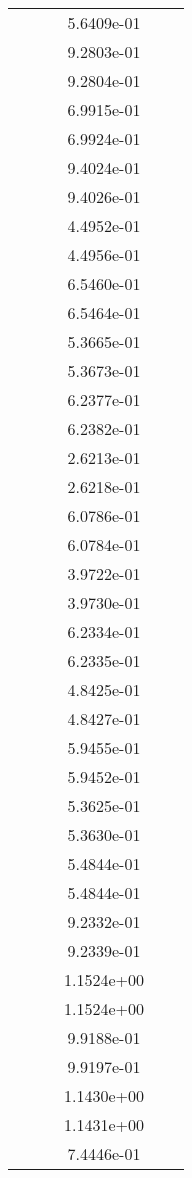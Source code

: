 \begin{xltabular}{\textwidth}{r|rS[table-format=1.3e+2]S[table-format=1.4e+2]S[table-format=1.4e+2]S[table-format=-1.5]}
&  &  & 5.6409e-01 & & \\
&  &  & 9.2803e-01 & & \\
&  &  & 9.2804e-01 & & \\
&  &  & 6.9915e-01 & & \\
&  &  & 6.9924e-01 & & \\
&  &  & 9.4024e-01 & & \\
&  &  & 9.4026e-01 & & \\
&  &  & 4.4952e-01 & & \\
&  &  & 4.4956e-01 & & \\
&  &  & 6.5460e-01 & & \\
&  &  & 6.5464e-01 & & \\
&  &  & 5.3665e-01 & & \\
&  &  & 5.3673e-01 & & \\
&  &  & 6.2377e-01 & & \\
&  &  & 6.2382e-01 & & \\
&  &  & 2.6213e-01 & & \\
&  &  & 2.6218e-01 & & \\
&  &  & 6.0786e-01 & & \\
&  &  & 6.0784e-01 & & \\
&  &  & 3.9722e-01 & & \\
&  &  & 3.9730e-01 & & \\
&  &  & 6.2334e-01 & & \\
&  &  & 6.2335e-01 & & \\
&  &  & 4.8425e-01 & & \\
&  &  & 4.8427e-01 & & \\
&  &  & 5.9455e-01 & & \\
&  &  & 5.9452e-01 & & \\
&  &  & 5.3625e-01 & & \\
&  &  & 5.3630e-01 & & \\
&  &  & 5.4844e-01 & & \\
&  &  & 5.4844e-01 & & \\
&  &  & 9.2332e-01 & & \\
&  &  & 9.2339e-01 & & \\
&  &  & 1.1524e+00 & & \\
&  &  & 1.1524e+00 & & \\
&  &  & 9.9188e-01 & & \\
&  &  & 9.9197e-01 & & \\
&  &  & 1.1430e+00 & & \\
&  &  & 1.1431e+00 & & \\
&  &  & 7.4446e-01 & & \\

\end{xltabular}
